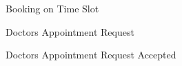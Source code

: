 \begin{figure}[H]
    \centering
    \qquad
    \caption{Booking on Time Slot}%
    \centering
\end{figure}

\begin{figure}[H]
    \centering
    \qquad
    \caption{Doctors Appointment Request}%
    \centering
\end{figure}

\begin{figure}[H]
    \centering
    \qquad
    \caption{Doctors Appointment Request Accepted}%
    \centering
\end{figure}



